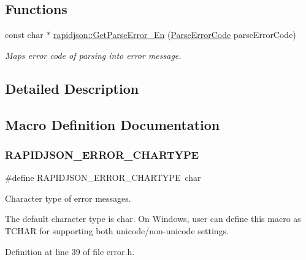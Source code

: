 \subsection*{Functions}
\begin{DoxyCompactItemize}
\item 
const char $\ast$ \mbox{\hyperlink{group___r_a_p_i_d_j_s_o_n___e_r_r_o_r_s_gae982013498511a0ef3c2a3d2069adb4f}{rapidjson\+::\+Get\+Parse\+Error\+\_\+\+En}} (\mbox{\hyperlink{group___r_a_p_i_d_j_s_o_n___e_r_r_o_r_s_ga7d3acf640886b1f2552dc8c4cd6dea60}{Parse\+Error\+Code}} parse\+Error\+Code)
\begin{DoxyCompactList}\small\item\em Maps error code of parsing into error message. \end{DoxyCompactList}\end{DoxyCompactItemize}


\subsection{Detailed Description}


\subsection{Macro Definition Documentation}
\mbox{\label{group___r_a_p_i_d_j_s_o_n___e_r_r_o_r_s_ga7e4636fd48d0148f102b8a13f0539d8c}} 
\subsubsection{\texorpdfstring{RAPIDJSON\_ERROR\_CHARTYPE}{RAPIDJSON\_ERROR\_CHARTYPE}}
{\footnotesize\ttfamily \#define R\+A\+P\+I\+D\+J\+S\+O\+N\+\_\+\+E\+R\+R\+O\+R\+\_\+\+C\+H\+A\+R\+T\+Y\+PE~char}



Character type of error messages. 

The default character type is {\ttfamily char}. On Windows, user can define this macro as {\ttfamily T\+C\+H\+AR} for supporting both unicode/non-\/unicode settings. 

Definition at line 39 of file error.\+h.

\mbox{\label{group___r_a_p_i_d_j_s_o_n___e_r_r_o_r_s_gabe2e1bd1349e5a7d6c1af78c05a98f0d}} 
